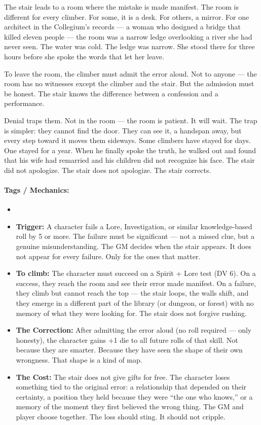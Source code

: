 The stair leads to a room where the mistake is made manifest. The room is different for every climber. For some, it is a desk. For others, a mirror. For one architect in the Collegium's records — a woman who designed a bridge that killed eleven people — the room was a narrow ledge overlooking a river she had never seen. The water was cold. The ledge was narrow. She stood there for three hours before she spoke the words that let her leave.

To leave the room, the climber must admit the error aloud. Not to anyone — the room has no witnesses except the climber and the stair. But the admission must be honest. The stair knows the difference between a confession and a performance.

Denial traps them. Not in the room — the room is patient. It will wait. The trap is simpler: they cannot find the door. They can see it, a handspan away, but every step toward it moves them sideways. Some climbers have stayed for days. One stayed for a year. When he finally spoke the truth, he walked out and found that his wife had remarried and his children did not recognize his face. The stair did not apologize. The stair does not apologize. The stair corrects.

\paragraph{Tags / Mechanics:}
\begin{itemize}
\item [TRUTH] [DREAM] [THRESHOLD]
\item \textbf{Trigger:} A character fails a Lore, Investigation, or similar knowledge-based roll by 5 or more. The failure must be significant — not a missed clue, but a genuine misunderstanding. The GM decides when the stair appears. It does not appear for every failure. Only for the ones that matter.
\item \textbf{To climb:} The character must succeed on a Spirit + Lore test (DV 6). On a success, they reach the room and see their error made manifest. On a failure, they climb but cannot reach the top — the stair loops, the walls shift, and they emerge in a different part of the library (or dungeon, or forest) with no memory of what they were looking for. The stair does not forgive rushing.
\item \textbf{The Correction:} After admitting the error aloud (no roll required — only honesty), the character gains +1 die to all future rolls of that skill. Not because they are smarter. Because they have seen the shape of their own wrongness. That shape is a kind of map.
\item \textbf{The Cost:} The stair does not give gifts for free. The character loses something tied to the original error: a relationship that depended on their certainty, a position they held because they were ``the one who knows,'' or a memory of the moment they first believed the wrong thing. The GM and player choose together. The loss should sting. It should not cripple.
\end{itemize}

